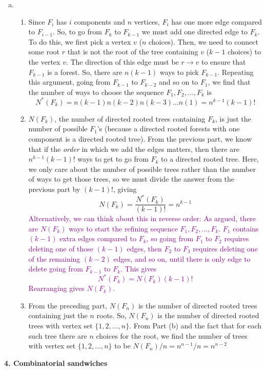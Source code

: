 \documentclass[11pt]{article}
\newcommand{\f}[2]{\frac{#1}{#2}}
\begin{document}
\begin{enumerate}[(a)]
	
	\item 
	\begin{enumerate}[1.]
		\item Since $F_i$ has $i$ components and $n$ vertices, $F_{i}$ has one more edge compared to $F_{i-1}$. So, to go from $F_{k}$ to $F_{k-1}$ we must add one directed edge to $F_k$. To do this, we first pick a vertex $v$ ($n$ choices). Then, we need to connect some root $r$ that is not the root of the tree containing $v$ ($k-1$ choices) to the vertex $v$. The direction of this edge must be $r\to v$ to ensure that $F_{k-1}$ is a forest. So, there are $n(k-1)$ ways to pick $F_{k-1}$. Repeating this argument, going from $F_{k-1}$ to $F_{k-2}$ and so on to $F_1$, we find that the number of ways to choose the sequence $F_1, F_2, \dots, F_k$ is 
		\begin{equation*}
		N^*(F_k) = n(k-1)n(k-2)n(k-3)\dots n(1) = \boxed{n^{k-1}(k-1)!}
		\end{equation*}
		
		\item $N(F_k)$, the number of directed rooted trees containing $F_k$, is just the number of possible $F_1$'s (because a directed rooted forests with one component is a directed rooted tree). From the previous part, we know that if the \textit{order} in which we add the edges matters, then there are $n^{k-1}(k-1)!$ ways to get to go from $F_k$ to a directed rooted tree. Here, we only care about the number of possible trees rather than the number of ways to get those trees, so we must divide the answer from the previous part by $(k-1)!$, giving
		\begin{equation*}
		N(F_k) = \f{N^*(F_k)}{(k-1)!} = \boxed{n^{k-1}}
		\end{equation*}
		\textcolor{purple}{Alternatively, we can think about this in reverse order: As argued, there are $N(F_k)$ ways to start the refining sequence $F_1, F_2, \dots, F_k$. $F_1$ contains $(k-1)$ extra edges compared to $F_k$, so going from $F_1$ to $F_2$ requires deleting one of those $(k-1)$ edges, then $F_2$ to $F_3$ requires deleting one of the remaining $(k-2)$ edges, and so on, until there is only edge to delete going from $F_{k-1}$ to $F_k$. This gives 
		\begin{equation*}
		N^*(F_k) = N(F_k)(k-1)!
		\end{equation*}
		Rearranging gives $N(F_k)$.}
		
		\item From the preceding part, $N(F_n)$ is the number of directed rooted trees containing just the $n$ roots. So, $N(F_n)$ is the number of directed rooted trees with vertex set $\{1,2,\dots,n\}$. From Part (b) and the fact that for each such tree there are $n$ choices for the root, we find the number of trees with vertex set $\{1,2,\dots,n\}$ to be $N(F_n)/n = n^{n-1}/n = \boxed{n^{n-2}}$
		
	\end{enumerate}
\end{enumerate}




\noindent \textbf{4. Combinatorial sandwiches}
\end{document}
